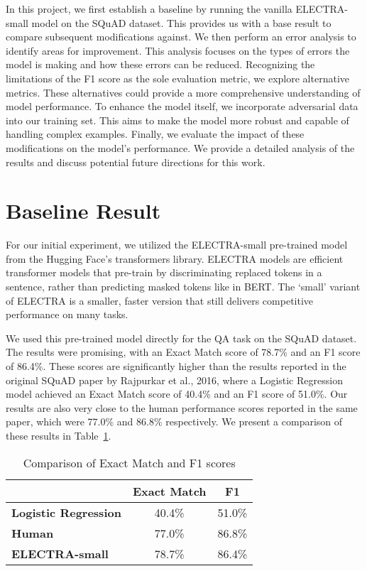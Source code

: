 \documentclass{article}
\begin{document}
In this project, we first establish a baseline by running the
vanilla ELECTRA-small model on the SQuAD dataset. This provides us with
a base result to compare subsequent modifications against.
We then perform an error analysis to identify areas for improvement.
This analysis focuses on the types of errors the model is making
and how these errors can be reduced.
Recognizing the limitations of the F1 score as the sole evaluation
metric, we explore alternative metrics. These alternatives could
provide a more comprehensive understanding of model performance.
To enhance the model itself, we incorporate adversarial data into our
training set. This aims to make the model more robust and capable
of handling complex examples.
Finally, we evaluate the impact of these modifications on the
model's performance. We provide a detailed analysis of the results
and discuss potential future directions for this work.

\section{Baseline Result}

For our initial experiment, we utilized the ELECTRA-small pre-trained model
\cite{clark2020electra} from the Hugging Face's transformers library.
ELECTRA models are efficient transformer models that pre-train by
discriminating replaced tokens in a sentence, rather than predicting
masked tokens like in BERT. The `small' variant of ELECTRA is a
smaller, faster version that still delivers competitive performance
on many tasks.

We used this pre-trained model directly for the QA task on the
SQuAD dataset. The results were promising, with an Exact Match
score of 78.7\% and an F1 score of 86.4\%. These scores are
significantly higher than the results reported in the original
SQuAD paper by Rajpurkar et al., 2016, where a Logistic Regression
model achieved an Exact Match score of 40.4\% and an F1 score of
51.0\%. Our results are also very close to the human performance
scores reported in the same paper, which were 77.0\% and 86.8\%
respectively.
We present a comparison of these results in Table~\ref{tab:results}.

\begin{table}[ht]
  \centering
  \begin{tabularx}{0.5\textwidth}{lcc}
  \toprule
   & \textbf{Exact Match} & \textbf{F1} \\
  \midrule
  \textbf{Logistic Regression} & 40.4\% & 51.0\% \\
  \textbf{Human} & 77.0\% & 86.8\% \\
  \textbf{ELECTRA-small} & 78.7\% & 86.4\% \\
  \bottomrule
  \end{tabularx}
  \caption{Comparison of Exact Match and F1 scores}
  \label{tab:results}
\end{table}
\end{document}
